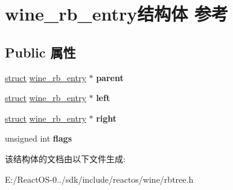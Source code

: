 \hypertarget{structwine__rb__entry}{}\section{wine\+\_\+rb\+\_\+entry结构体 参考}
\label{structwine__rb__entry}
\subsection*{Public 属性}
\begin{DoxyCompactItemize}
\item 
\mbox{\label{structwine__rb__entry_aece7b5e1c8291ac67b8cff931c6d3e7e}} 
\hyperlink{interfacestruct}{struct} \hyperlink{structwine__rb__entry}{wine\+\_\+rb\+\_\+entry} $\ast$ {\bfseries parent}
\item 
\mbox{\label{structwine__rb__entry_ad4278272f5730e75bc92516ed898f820}} 
\hyperlink{interfacestruct}{struct} \hyperlink{structwine__rb__entry}{wine\+\_\+rb\+\_\+entry} $\ast$ {\bfseries left}
\item 
\mbox{\label{structwine__rb__entry_aeb3a2a4fa86fcce1663051cd426ac971}} 
\hyperlink{interfacestruct}{struct} \hyperlink{structwine__rb__entry}{wine\+\_\+rb\+\_\+entry} $\ast$ {\bfseries right}
\item 
\mbox{\label{structwine__rb__entry_a6277b7137f5da7f5af5d9017bf57cc2f}} 
unsigned int {\bfseries flags}
\end{DoxyCompactItemize}


该结构体的文档由以下文件生成\+:\begin{DoxyCompactItemize}
\item 
E\+:/\+React\+O\+S-\/0../sdk/include/reactos/wine/rbtree.\+h\end{DoxyCompactItemize}
